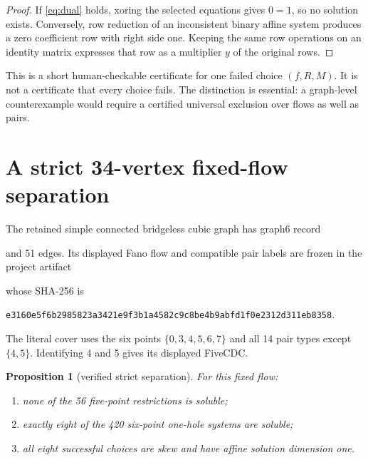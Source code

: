 \documentclass[11pt]{article}
\newtheorem{proposition}[theorem]{Proposition}
\theoremstyle{definition}
\theoremstyle{remark}
\newcommand{\FiveCDC}{\textup{FiveCDC}}
\numberwithin{equation}{section}
\begin{document}
\begin{proof}
If \eqref{eq:dual} holds, xoring the selected equations gives \(0=1\),
so no solution exists.  Conversely, row reduction of an inconsistent
binary affine system produces a zero coefficient row with right side one.
Keeping the same row operations on an identity matrix expresses that row
as a multiplier \(y\) of the original rows.
\end{proof}

This is a short human-checkable certificate for one failed choice
\((f,R,M)\).  It is not a certificate that every choice fails.  The
distinction is essential: a graph-level counterexample would require a
certified universal exclusion over flows as well as pairs.

\section{A strict 34-vertex fixed-flow separation}

The retained simple connected bridgeless cubic graph has graph6 record
\begin{center}
\small
{}
\end{center}
and 51 edges.  Its displayed Fano flow and compatible pair labels are
frozen in the project artifact
\begin{center}
\small
{}
\end{center}
whose SHA-256 is
\begin{center}
\scriptsize
\nolinkurl{e3160e5f6b2985823a3421e9f3b1a4582c9c8be4b9abfd1f0e2312d311eb8358}.
\end{center}
\par\noindent
The literal cover uses the six points \(\{0,3,4,5,6,7\}\) and all 14
pair types except \(\{4,5\}\).  Identifying 4 and 5 gives its displayed
\FiveCDC.

\par\medskip
\begin{proposition}[verified strict separation]
\label{prop:strict}
For this fixed flow:
\begin{enumerate}
\item none of the 56 five-point restrictions is soluble;
\item exactly eight of the 420 six-point one-hole systems are soluble;
\item all eight successful choices are skew and have affine solution
      dimension one.
\end{enumerate}
\end{proposition}
\end{document}

